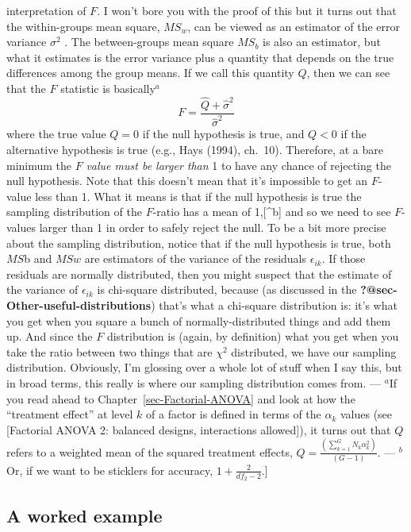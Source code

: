 \documentclass[
  a4paper,
]{book}
\begin{document}
{  interpretation of \(F\). I won't bore you with the proof of this but
  it turns out that the within-groups mean square, \(MS_w\), can be
  viewed as an estimator of the error variance \(\sigma^2\) . The
  between-groups mean square \(MS_b\) is also an estimator, but what it
  estimates is the error variance plus a quantity that depends on the
  true differences among the group means. If we call this quantity
  \(Q\), then we can see that the \(F\) statistic is basically\(^a\)
  \[F=\frac{\hat{Q}+\hat{\sigma}^2}{\hat{\sigma}^2}\] where the true
  value \(Q = 0\) if the null hypothesis is true, and \(Q < 0\) if the
  alternative hypothesis is true (e.g., Hays (1994), ch.~10). Therefore,
  at a bare minimum the \(F\) \emph{value must be larger than} 1 to have
  any chance of rejecting the null hypothesis. Note that this doesn't
  mean that it's impossible to get an \(F\)-value less than 1. What it
  means is that if the null hypothesis is true the sampling distribution
  of the \(F\)-ratio has a mean of 1,{[}\^{}b{]} and so we need to see
  \(F\)-values larger than 1 in order to safely reject the null. To be a
  bit more precise about the sampling distribution, notice that if the
  null hypothesis is true, both \(MS\)b and \(MSw\) are estimators of
  the variance of the residuals \(\epsilon_{ik}\). If those residuals
  are normally distributed, then you might suspect that the estimate of
  the variance of \(\epsilon_{ik}\) is chi-square distributed, because
  (as discussed in the \textbf{?@sec-Other-useful-distributions}) that's
  what a chi-square distribution is: it's what you get when you square a
  bunch of normally-distributed things and add them up. And since the
  \(F\) distribution is (again, by definition) what you get when you
  take the ratio between two things that are \(\chi^2\) distributed, we
  have our sampling distribution. Obviously, I'm glossing over a whole
  lot of stuff when I say this, but in broad terms, this really is where
  our sampling distribution comes from. --- \(^a\)If you read ahead to
  Chapter~\ref{sec-Factorial-ANOVA} and look at how the ``treatment
  effect'' at level \(k\) of a factor is defined in terms of the
  \(\alpha_k\) values (see {[}Factorial ANOVA 2: balanced designs,
  interactions allowed{]}), it turns out that \(Q\) refers to a weighted
  mean of the squared treatment effects,
  \(Q = \frac{(\sum_{k=1}^{G}N_k \alpha_k^2)}{(G-1)}\). --- \(^b\)Or, if
  we want to be sticklers for accuracy, \(1+ \frac{2}{df_2-2}\).}{]}

\hypertarget{a-worked-example}{%
\subsection{A worked example}\label{a-worked-example}}
\end{document}
